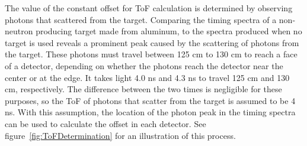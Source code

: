 The value of the constant offset for ToF calculation is determined by observing photons that scattered from the target.
Comparing the timing spectra of a non-neutron producing target made from aluminum, to the spectra produced when no target is used reveals a prominent peak caused by the scattering of photons from the target.
These photons must travel between 125 cm to 130 cm to reach a face of a detector, depending on whether the photons reach the detector near the center or at the edge.
It takes light 4.0 ns and 4.3 ns to travel 125 cm and 130 cm, respectively.
The difference between the two times is negligible for these purposes, so the ToF of photons that scatter from the target is assumed to be 4 ns.
With this assumption, the location of the photon peak in the timing spectra can be used to calculate the offset in each detector.
See figure~\ref{fig:ToFDetermination} for an illustration of this process.
